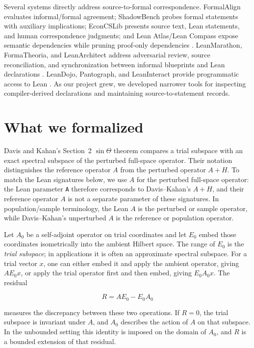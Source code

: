 \documentclass{article}
\begin{document}
Several systems directly address source-to-formal correspondence.  FormalAlign
evaluates informal/formal agreement; ShadowBench probes formal statements with
auxiliary implications; EconCSLib presents source text, Lean statements, and
human correspondence judgments; and Lean Atlas/Lean Compass expose semantic
dependencies while pruning proof-only dependencies
\citep{lu2025formalalign,han2026shadowbench,garg2026econcs,yanahama2026leanatlas}.
LeanMarathon, FormaTheoria, and LeanArchitect address adversarial review,
source reconciliation, and synchronization between informal blueprints and
Lean declarations
\citep{zhang2026leanmarathon,nie2026formatheoria,zhu2026leanarchitect}.
LeanDojo, Pantograph, and LeanInteract provide programmatic access to Lean
\citep{yang2023leandojo,aniva2024pantograph,poiroux2025leaninteract}.  As our
project grew, we developed narrower tools for inspecting compiler-derived
declarations and maintaining source-to-statement records.

\section{What we formalized}
\label{sec:dk}

Davis and Kahan's Section~2 $\sin\Theta$ theorem compares a trial subspace
with an exact spectral subspace of the perturbed full-space operator.  Their
notation distinguishes the reference operator $A$ from the perturbed operator
$A+H$.  To match the Lean signatures below, we use $A$ for the perturbed
full-space operator: the Lean parameter \texttt{A} therefore corresponds to
Davis--Kahan's $A+H$, and their reference operator $A$ is not a separate
parameter of these signatures.  In population/sample terminology, the Lean
$A$ is the perturbed or sample operator, while Davis--Kahan's unperturbed $A$
is the reference or population operator.

Let $A_0$ be a self-adjoint operator on trial coordinates and let $E_0$ embed
those coordinates isometrically into the ambient Hilbert space. The range of
$E_0$ is the \emph{trial subspace}; in applications it is often an approximate
spectral subspace. For a trial vector $x$, one can either embed it and apply
the ambient operator, giving $AE_0x$, or apply the trial operator first and
then embed, giving $E_0A_0x$. The residual

\[
  R=AE_0-E_0A_0
  \]

measures the discrepancy between these two operations. If $R=0$, the trial
subspace is invariant under $A$, and $A_0$ describes the action of $A$ on that
subspace. In the unbounded setting this identity is imposed on the domain of
$A_0$, and $R$ is a bounded extension of that residual.
\end{document}
